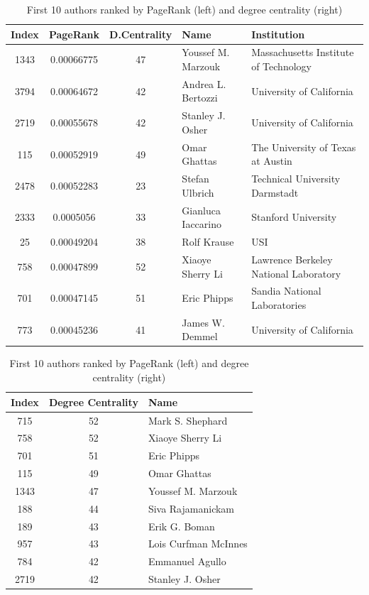 \documentclass[]{usiinfbachelorproject}
\begin{document}
\newcommand\eee{\centering}
\begin{table}[tbh]
\centering
\tiny
\caption{First 10 authors ranked by PageRank (left) and degree centrality (right)}
\begin{tabular}{c c c l l}
\textbf{Index} & \textbf{PageRank} & \textbf{D.Centrality} & \textbf{Name} & \textbf{Institution}\\
\hline
1343 & 0.00066775 & 47 & Youssef M. Marzouk & Massachusetts Institute of Technology \\
3794 & 0.00064672 & 42 & Andrea L. Bertozzi & University of California \\
2719 & 0.00055678 & 42 & Stanley J. Osher & University of California \\
115 & 0.00052919 & 49 & Omar Ghattas & The University of Texas at Austin \\
2478 & 0.00052283 & 23 & Stefan Ulbrich & Technical University Darmstadt \\
2333 & 0.0005056 & 33 & Gianluca Iaccarino & Stanford University \\
25 & 0.00049204 & 38 & Rolf Krause & USI \\
758 & 0.00047899 & 52 & Xiaoye Sherry Li & Lawrence Berkeley National Laboratory \\
701 & 0.00047145 & 51 & Eric Phipps & Sandia National Laboratories \\
773 & 0.00045236 & 41 & James W. Demmel& University of California
\end{tabular}
\qquad\qquad
\begin{tabular}{c c l}
\textbf{Index} & \textbf{Degree Centrality} & \textbf{Name} \\
\hline
715& 52 & Mark S. Shephard \\
758 & 52 & Xiaoye Sherry Li \\
701 & 51 & Eric Phipps\\
115 &49 & Omar Ghattas \\
1343 & 47 & Youssef M. Marzouk\\
188 & 44 & Siva Rajamanickam\\
189 & 43 & Erik G. Boman\\
957 & 43 & Lois Curfman McInnes\\
784 & 42 & Emmanuel Agullo \\
2719 & 42 & Stanley J. Osher
\end{tabular}
\label{table:prW}
\end{table}
\end{document}
